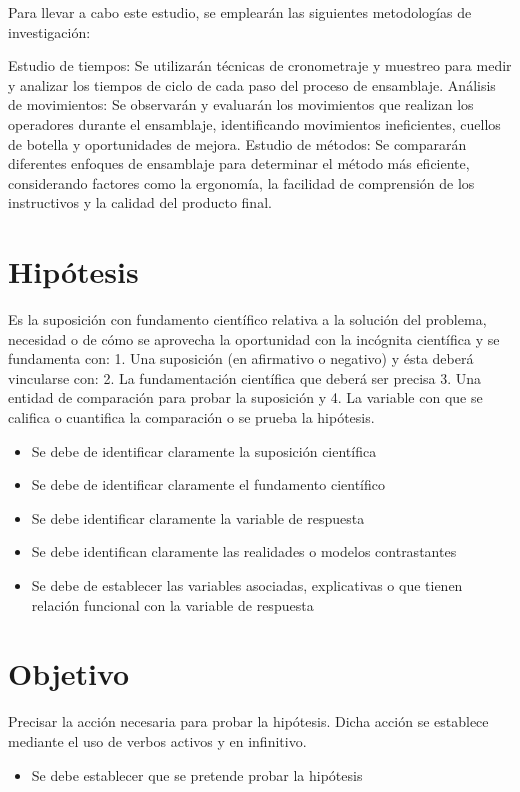 \begin{itemize}
    Para llevar a cabo este estudio, se emplearán las siguientes metodologías de investigación:
    
    Estudio de tiempos: Se utilizarán técnicas de cronometraje y muestreo para medir y analizar los tiempos de ciclo de cada paso del proceso de ensamblaje.
    Análisis de movimientos: Se observarán y evaluarán los movimientos que realizan los operadores durante el ensamblaje, identificando movimientos ineficientes, cuellos de botella y oportunidades de mejora.
    Estudio de métodos: Se compararán diferentes enfoques de ensamblaje para determinar el método más eficiente, considerando factores como la ergonomía, la facilidad de comprensión de los instructivos y la calidad del producto final.
    \end{itemize}
    \section{Hipótesis}
    
    Es la suposición con fundamento científico relativa a la solución del problema, necesidad o de cómo se aprovecha la oportunidad con la incógnita científica y se fundamenta con: 1. Una suposición (en afirmativo o negativo) y ésta deberá vincularse con:
    2. La fundamentación científica que deberá ser precisa 3. Una entidad de comparación para probar la suposición y
    4. La variable con que se califica o cuantifica la comparación o se prueba la hipótesis.
    
    \begin{itemize}
        \item Se debe de identificar claramente la suposición científica
        \item Se debe de identificar claramente el fundamento científico
        \item Se debe identificar claramente la variable de respuesta
        \item Se debe identifican claramente las realidades o modelos contrastantes
        \item Se debe de establecer las variables asociadas, explicativas o que tienen relación funcional con la variable de respuesta
    \end{itemize}
    \section{Objetivo}
    
    Precisar la acción necesaria para probar la hipótesis. Dicha acción se establece mediante el uso de verbos activos y en infinitivo.
    \begin{itemize}
        \item Se debe establecer que se pretende probar la hipótesis
    \end{itemize}
    
